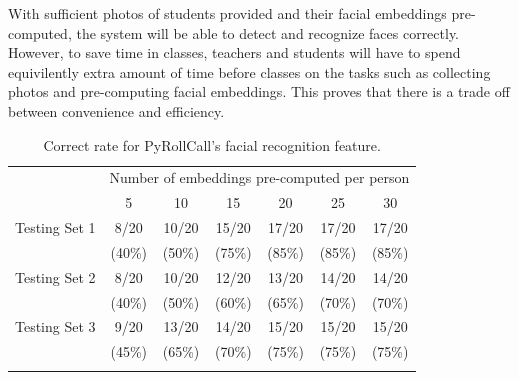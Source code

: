 With sufficient photos of students provided and their facial embeddings pre-computed,
the system will be able to detect and recognize faces correctly. However, to save time
in classes, teachers and students will have to spend equivilently extra amount of time
before classes on the tasks such as collecting photos and pre-computing facial embeddings.
This proves that there is a trade off between convenience and efficiency.
\vspace{0.2cm}

\begin{table}[!htb]
\centering
\caption{Correct rate for PyRollCall's facial recognition feature.} 
\begin{tabular}{@{}lcccccc@{}}
\toprule[2pt]
& \multicolumn{6}{c}{Number of embeddings pre-computed per person}                                                                                                               \\ \addlinespace[0.5em]
              & 5                          & 10                         & 15                         & 20                         & 25                         & 30                         \\ \midrule \addlinespace[0.5em]
Testing Set 1 & 8/20                       & 10/20                      & 15/20                      & 17/20                      & 17/20                      & 17/20                      \\
              & \multicolumn{1}{c}{(40\%)} & \multicolumn{1}{c}{(50\%)} & \multicolumn{1}{c}{(75\%)} & \multicolumn{1}{c}{(85\%)} & \multicolumn{1}{c}{(85\%)} & \multicolumn{1}{c}{(85\%)} \\ \addlinespace[0.5em] \midrule \addlinespace[0.5em]
Testing Set 2 & 8/20                       & 10/20                      & 12/20                      & 13/20                      & 14/20                      & 14/20                      \\
              & \multicolumn{1}{c}{(40\%)} & \multicolumn{1}{c}{(50\%)} & \multicolumn{1}{c}{(60\%)} & \multicolumn{1}{c}{(65\%)} & \multicolumn{1}{c}{(70\%)} & \multicolumn{1}{c}{(70\%)} \\ \addlinespace[0.5em] \midrule \addlinespace[0.5em]
Testing Set 3 & 9/20                       & 13/20                      & 14/20                      & 15/20                      & 15/20                      & 15/20                      \\
              & \multicolumn{1}{c}{(45\%)} & \multicolumn{1}{c}{(65\%)} & \multicolumn{1}{c}{(70\%)} & \multicolumn{1}{c}{(75\%)} & \multicolumn{1}{c}{(75\%)} & \multicolumn{1}{c}{(75\%)} \\ \addlinespace[0.5em]
\bottomrule[2pt]
\end{tabular}
\label{tab:sometab}
\end{table}


